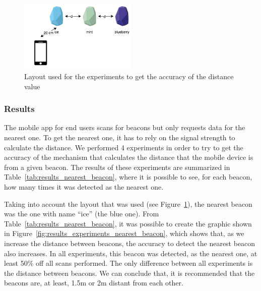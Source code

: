 

\begin{figure}[!ht]
  \centering
    \includegraphics[width=0.5\textwidth, keepaspectratio]{figures/nearest_beacon}
    \caption[Layout for experiments of nearest beacon]{Layout used for the experiments to get the accuracy of the distance value}
    \label{fig:layout_experiments_nearest_beacon}
\end{figure}

\subsubsection{Results}
\label{sub:evaluation_nearest_beacon_results}
The mobile app for end users scans for beacons but only requests data for the nearest one. To get the nearest one, it has to rely on the signal strength to calculate the distance. We performed 4 experiments in order to try to get the accuracy of the mechanism that calculates the distance that the mobile device is from a given beacon.
The results of these experiments are summarized in Table~\ref{tab:results_nearest_beacon}, where it is possible to see, for each beacon, how many times it was detected as the nearest one.

Taking into account the layout that was used (see Figure~\ref{fig:layout_experiments_nearest_beacon}), the nearest beacon was the one with name ``ice'' (the blue one).
From Table~\ref{tab:results_nearest_beacon}, it was possible to create the graphic shown in Figure~\ref{fig:results_experiments_nearest_beacon}, which shows that, as we increase the distance between beacons, the accuracy to detect the nearest beacon also increases.
In all experiments, this beacon was detected, as the nearest one, at least 50\% off all scans performed.
The only difference between all experiments is the distance between beacons.
We can conclude that, it is recommended that the beacons are, at least, 1.5m or 2m distant from each other.



